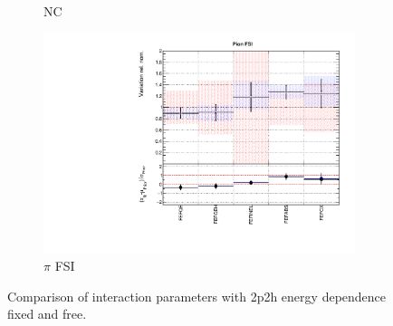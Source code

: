 \begin{figure}
\begin{subfigure}{0.49\textwidth}
  \caption{NC}
\end{subfigure}
\begin{subfigure}{0.49\textwidth}
  \centering
  \includegraphics[width=0.9\linewidth]{figs/fixed2p2hfitsxsec5}
  \caption{$\pi$ FSI}
\end{subfigure}
\caption{Comparison of interaction parameters with 2p2h energy dependence fixed and free.}
\label{fig:fixed2p2hxsec}
\end{figure}

